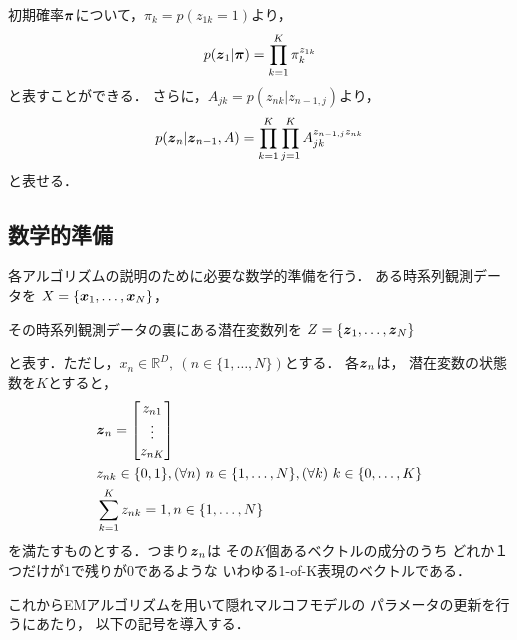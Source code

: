 初期確率$\mbox{\boldmath $\pi$}$について，$\pi_k=p(z_{1k}=1)$より，
\begin{align}
  p(\mbox{\boldmath $z$}_1|\mbox{\boldmath $\pi$}) = \prod_{k=1}^K\pi_k^{z_{1k}} \label{eq:initial-probability}
\end{align}
と表すことができる．
さらに，$A_{jk} = p(z_{nk}|z_{n-1,j})$より，
\begin{align}
  p(\mbox{\boldmath $z$}_n|\mbox{\boldmath $z$}_{n-1},A) = \prod_{k=1}^K\prod_{j=1}^KA_{jk}^{z_{n-1,j}z_{nk}} \label{eq:transition-probability}
\end{align}
と表せる．

\subsection{数学的準備}
\label{sec:prepare:math-prepare}
各アルゴリズムの説明のために必要な数学的準備を行う．
ある時系列観測データを
$X = \{\mbox{\boldmath $x$}_1, \dots, \mbox{\boldmath $x$}_N\}$，

その時系列観測データの裏にある潜在変数列を
$Z = \{\mbox{\boldmath $z$}_1, \dots, \mbox{\boldmath $z$}_N\}$

と表す．ただし，$x_n \in \mathbb{R}^D,\ (n\in \{1,\dots,N\})$とする．
各$\mbox{\boldmath $z$}_n$は，
潜在変数の状態数を$K$とすると，
\begin{align}
  &\mbox{\boldmath $z$}_n =
  \begin{bmatrix}
    z_{n1} \\
    \vdots \\
    z_{nK} \\
  \end{bmatrix}\\
  & z_{nk} \in \{0,1\}, (\forall n)\ n\in \{1,\dots,N\},
  (\forall k)\ k \in \{0,\dots,K\} \\
  &\sum_{k=1}^Kz_{nk} = 1, n\in \{1,\dots,N\}
\end{align}
を満たすものとする．つまり$\mbox{\boldmath $z$}_n$は
その$K$個あるベクトルの成分のうち
どれか１つだけが$1$で残りが$0$であるような
いわゆる1-of-K表現のベクトルである．

これからEMアルゴリズムを用いて隠れマルコフモデルの
パラメータの更新を行うにあたり，
以下の記号を導入する．

